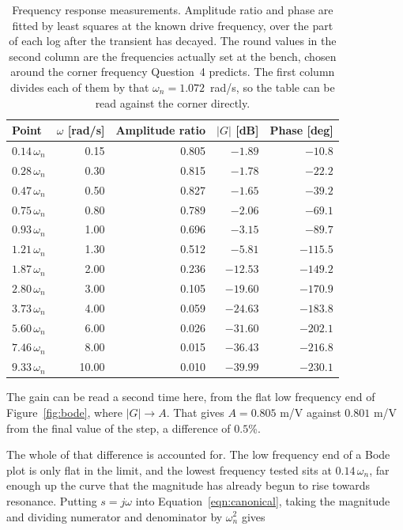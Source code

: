 \begin{table}[h!]
\centering
\begin{tabular}{lrrrr}
\toprule
\textbf{Point} & \textbf{$\omega$ [rad/s]} & \textbf{Amplitude ratio} &
\textbf{$|G|$ [dB]} & \textbf{Phase [deg]} \\
\midrule
$0.14\,\omega_n$ & 0.15 & 0.805 & $-1.89$ & $-10.8$ \\
$0.28\,\omega_n$ & 0.30 & 0.815 & $-1.78$ & $-22.2$ \\
$0.47\,\omega_n$ & 0.50 & 0.827 & $-1.65$ & $-39.2$ \\
$0.75\,\omega_n$ & 0.80 & 0.789 & $-2.06$ & $-69.1$ \\
$0.93\,\omega_n$ & 1.00 & 0.696 & $-3.15$ & $-89.7$ \\
$1.21\,\omega_n$ & 1.30 & 0.512 & $-5.81$ & $-115.5$ \\
$1.87\,\omega_n$ & 2.00 & 0.236 & $-12.53$ & $-149.2$ \\
$2.80\,\omega_n$ & 3.00 & 0.105 & $-19.60$ & $-170.9$ \\
$3.73\,\omega_n$ & 4.00 & 0.059 & $-24.63$ & $-183.8$ \\
$5.60\,\omega_n$ & 6.00 & 0.026 & $-31.60$ & $-202.1$ \\
$7.46\,\omega_n$ & 8.00 & 0.015 & $-36.43$ & $-216.8$ \\
$9.33\,\omega_n$ & 10.00 & 0.010 & $-39.99$ & $-230.1$ \\
\bottomrule
\end{tabular}
\caption{Frequency response measurements. Amplitude ratio and phase are fitted by least
squares at the known drive frequency, over the part of each log after the transient has
decayed. The round values in the second column are the frequencies actually set at the bench,
chosen around the corner frequency Question~4 predicts. The first column divides each of them
by that $\omega_n = 1.072$~rad/s, so the table can be read against the corner directly.}
\label{tab:freq}
\end{table}

The gain can be read a second time here, from the flat low frequency end of
Figure~\ref{fig:bode}, where $|G| \to A$. That gives $A = 0.805$ m/V against $0.801$ m/V
from the final value of the step, a difference of $0.5$\%.

The whole of that difference is accounted for. The low frequency end of a Bode plot is only
flat in the limit, and the lowest frequency tested sits at $0.14\,\omega_n$, far enough up
the curve that the magnitude has already begun to rise towards resonance. Putting $s = j\omega$
into Equation~\ref{eqn:canonical}, taking the magnitude and dividing numerator and
denominator by $\omega_n^2$ gives

